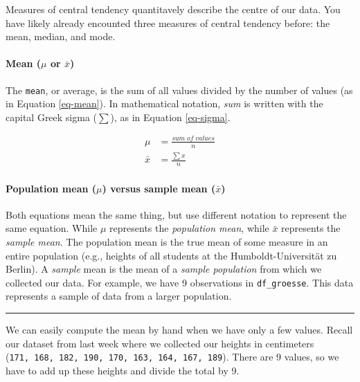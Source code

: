 \documentclass[
  letterpaper,
  DIV=11,
  numbers=noendperiod]{scrartcl}
\let\oldparagraph\paragraph
\renewcommand{\paragraph}[1]{\oldparagraph{#1}\mbox{}}
\begin{document}
Measures of central tendency quantitavely describe the centre of our
data. You have likely already encounted three measures of central
tendency before: the mean, median, and mode.

\hypertarget{mean-mu-or-barx}{%
\paragraph{\texorpdfstring{Mean (\(\mu\) or
\(\bar{x}\))}{Mean (\textbackslash mu or \textbackslash bar\{x\})}}\label{mean-mu-or-barx}}

The \texttt{mean}, or average, is the sum of all values divided by the
number of values (as in Equation \ref{eq-mean}). In mathematical
notation, \emph{sum} is written with the capital Greek sigma (\(\sum\)),
as in Equation \ref{eq-sigma}.

\begin{align}
\mu &= \frac{sum\;of\;values} 
           {n} \label{eq-mean} \\
\bar{x} &= \frac{\sum{x}}      
           {n} \label{eq-sigma} 
\end{align}

\hypertarget{population-mean-mu-versus-sample-mean-barx}{%
\paragraph{\texorpdfstring{Population mean (\(\mu\)) versus sample mean
(\(\bar{x}\))}{Population mean (\textbackslash mu) versus sample mean (\textbackslash bar\{x\})}}\label{population-mean-mu-versus-sample-mean-barx}}

Both equations mean the same thing, but use different notation to
represent the same equation. While \(\mu\) represents the
\emph{population mean}, while \(\bar{x}\) represents the \emph{sample
mean}. The population mean is the true mean of some measure in an entire
population (e.g., heights of all students at the Humboldt-Universität zu
Berlin). A \emph{sample} mean is the mean of a \emph{sample population}
from which we collected our data. For example, we have 9 observations in
\texttt{df\_groesse}. This data represents a sample of data from a
larger population.

\begin{center}\rule{0.5\linewidth}{0.5pt}\end{center}

We can easily compute the mean by hand when we have only a few values.
Recall our dataset from last week where we collected our heights in
centimeters
(\texttt{171,\ 168,\ 182,\ 190,\ 170,\ 163,\ 164,\ 167,\ 189}). There
are 9 values, so we have to add up these heights and divide the total by
9.
\end{document}
